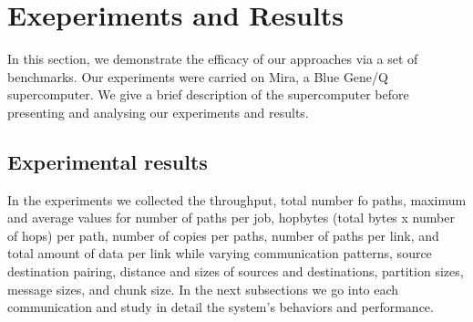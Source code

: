 \section{Exeperiments and Results}
\label{sec:benchmark}

In this section, we demonstrate the efficacy of our approaches via a set of benchmarks. Our experiments were carried on Mira, a Blue Gene/Q supercomputer. We give a brief description of the supercomputer before presenting and analysing our experiments and results.









\subsection{Experimental results}

In the experiments we collected the throughput, total number fo paths, maximum and average values for number of paths per job, hopbytes (total bytes x number of hops) per path, number of copies per paths, number of paths per link, and total amount of data per link while varying communication patterns, source destination pairing, distance and sizes of sources and destinations, partition sizes, message sizes, and chunk size.
In the next subsections we go into each communication and study in detail the system's behaviors and performance.




















